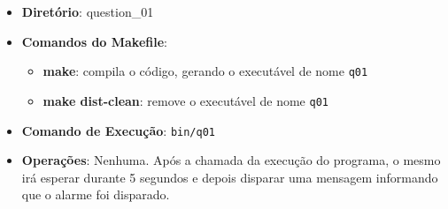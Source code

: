 \begin{itemize}
	\item{\textbf{Diretório}: question\_01}
	\item{\textbf{Comandos do Makefile}:
	\begin{itemize}
		\item{\textbf{make}: compila o código, gerando o executável de nome \texttt{q01}}
		\item{\textbf{make dist-clean}: remove o executável de nome \texttt{q01}}
	\end{itemize}}
	\item{\textbf{Comando de Execução}: \texttt{bin/q01}}
	\item{\textbf{Operações}: Nenhuma. Após a chamada da execução do programa, o mesmo irá esperar 
	durante 5 segundos e depois disparar uma mensagem informando que o alarme foi disparado.}
\end{itemize}
